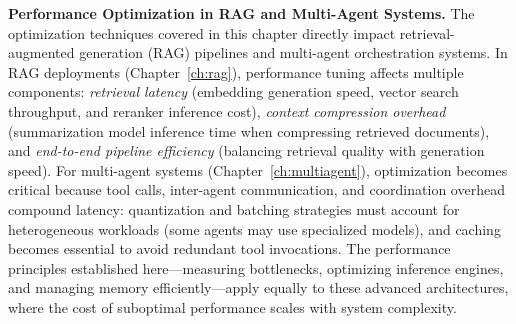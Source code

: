 
\medskip
\noindent\textbf{Performance Optimization in RAG and Multi-Agent Systems.} The optimization techniques covered in this chapter directly impact retrieval-augmented generation (RAG) pipelines and multi-agent orchestration systems. In RAG deployments (Chapter~\ref{ch:rag}), performance tuning affects multiple components: \emph{retrieval latency} (embedding generation speed, vector search throughput, and reranker inference cost), \emph{context compression overhead} (summarization model inference time when compressing retrieved documents), and \emph{end-to-end pipeline efficiency} (balancing retrieval quality with generation speed). For multi-agent systems (Chapter~\ref{ch:multiagent}), optimization becomes critical because tool calls, inter-agent communication, and coordination overhead compound latency: quantization and batching strategies must account for heterogeneous workloads (some agents may use specialized models), and caching becomes essential to avoid redundant tool invocations. The performance principles established here---measuring bottlenecks, optimizing inference engines, and managing memory efficiently---apply equally to these advanced architectures, where the cost of suboptimal performance scales with system complexity.

